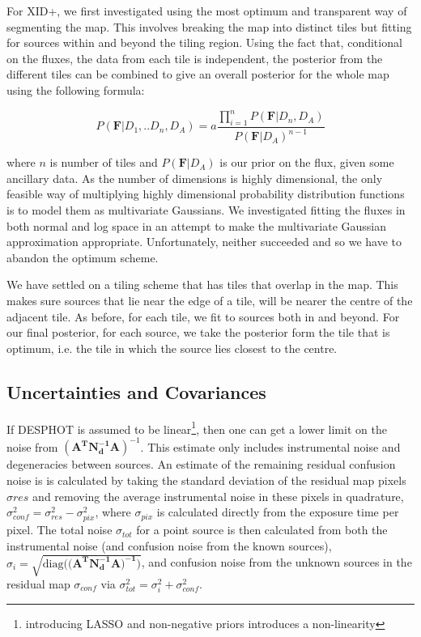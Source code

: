\documentclass[useAMS,usenatbib]{mn2e}
\begin{document}
For XID+, we first investigated using the most optimum and transparent way of segmenting the map. This involves breaking the map into distinct tiles but fitting for sources within and beyond the tiling region. Using the fact that, conditional on the fluxes, the data from each tile is independent, the posterior from the different tiles can be combined to give an overall posterior for the whole map using the following formula:

\begin{equation}
P(\mathbf{F}|D_1,..D_n,D_A)=a\frac{\prod_{i=1}^n P(\mathbf{F}|D_n,D_A)}{P(\mathbf{F}|D_A)^{n-1}}
\end{equation}

where $n$ is number of tiles and $P(\mathbf{F}|D_A)$ is our prior on the flux, given some ancillary data. As the number of dimensions is highly dimensional, the only feasible way of multiplying highly dimensional probability distribution functions is to model them as multivariate Gaussians. We investigated fitting the fluxes in both normal and log space in an attempt to make the multivariate Gaussian approximation appropriate. Unfortunately, neither succeeded and so we have to abandon the optimum scheme.

We have settled on a tiling scheme that has tiles that overlap in the map. This makes sure sources that lie near the edge of a tile, will be nearer the centre of the adjacent tile. As before, for each tile, we fit to sources both in and beyond. For our final posterior, for each source, we take the posterior form the tile that is optimum, i.e. the tile in which the source lies closest to the centre.

\subsection{Uncertainties and Covariances}
If DESPHOT is assumed to be linear\footnote{introducing LASSO and non-negative priors introduces a non-linearity}, then one can get a lower limit on the noise from $(\mathbf{A^TN_d^{-1}A})^{-1}$. This estimate only includes instrumental noise and degeneracies between sources. An estimate of the remaining residual confusion noise is is calculated by taking the standard deviation of the residual map pixels $\sigma{res}$ and removing the average instrumental noise in these pixels in quadrature, $\sigma^2_{conf} = \sigma^2_{res} - \sigma^2_{pix}$, where $\sigma_{pix}$ is calculated directly from the exposure time per pixel. The total noise $\sigma_{tot}$ for a point source is then calculated from both the instrumental noise (and confusion noise from the known sources), $\sigma_{i} = \sqrt{\mathrm{diag}((\mathbf{A^TN^{-1}_dA)^{-1})}}$, and confusion noise from the unknown sources in the residual map $\sigma_{conf}$ via $\sigma^2_{tot} = \sigma^2_{i} + \sigma^2_{conf}$. 
\end{document}
